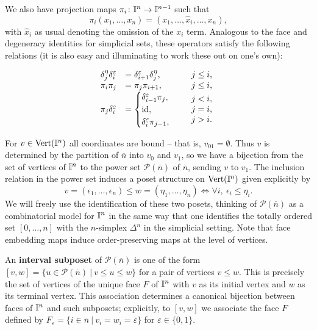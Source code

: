 We also have projection maps $\pi_i \colon \mathbb{I}^n \to \mathbb{I}^{n-1}$ such that
\[\pi_i(x_1, \ldots, x_n) = (x_1, \ldots, \hat x_i, \ldots, x_n),\]
with $\hat x_i$ as usual denoting the omission of the $x_i$ term.
Analogous to the face and degeneracy identities for simplicial sets, these operators satisfy the following relations \cite[Section 4]{GrMa03} (it is also easy and illuminating to work these out on one's own):

\[
	\begin{array}{rlc}
		\delta_j^\eta \delta_i^\varepsilon &= \delta_{i+1}^\varepsilon \delta_j^\eta, &j\leq i,\\
		\pi_i \pi_j &= \pi_j \pi_{i+1}, & j \leq i,\\
		\pi_j \delta^\varepsilon_i &=
			\begin{cases}
				\delta_{i-1}^\varepsilon \pi_j, \\
				\mathrm{id},\\
				\delta_i^\varepsilon \pi_{j-1},
			\end{cases}
		&\begin{array}{lll}j<i, \\ j=i, \\ j>i. \end{array}
	\end{array}
\]

For $v \in {\rm Vert}(\mathbb{I}^n)$ all coordinates are bound -- that is, $v_{01} = \emptyset$.
Thus $v$ is determined by the partition of $\overline n$ into $v_0$ and $v_1$, so
we have a bijection from the set of vertices of $\mathbb{I}^n$ to the power set $\mathcal P(\overline n)$ of $\overline n$, sending $v$ to $v_1$.
The inclusion relation in the power set induces a poset structure on ${\rm Vert}(\mathbb{I}^n)$ given explicitly by
\begin{equation*}
	v = (\epsilon_1, \dots, \epsilon_n) \leq w = (\eta_1, \dots, \eta_n) \iff \forall i,\ \epsilon_i \leq \eta_i.
\end{equation*}
We will freely use the identification of these two posets, thinking of $\mathcal P(\overline n)$ as a combinatorial model for $\mathbb{I}^n$ in the same way that one identifies the totally ordered set $[0,\dots, n]$ with the $n$-simplex $\Delta^n$ in the simplicial setting.
Note that face embedding maps induce order-preserving maps at the level of vertices.

An \textbf{interval subposet} of $\mathcal P(\overline n)$ is one of the form $[v, w] = \{u \in \mathcal P(\overline n)\ |\ v \leq u \leq w\}$ for a pair of vertices $v \leq w$.
This is precisely the set of vertices of the unique face $F$ of $\mathbb{I}^n$ with $v$ as its initial vertex and $w$ as its terminal vertex.
This association determines a canonical bijection between faces of $\mathbb{I}^n$ and such subposets; explicitly, to $[v, w]$ we associate the face $F$ defined by $F_\varepsilon = \{i \in \overline{n}\ |\ v_i = w_i = \varepsilon\}$ for $\varepsilon \in \{0, 1\}$.

